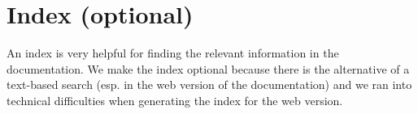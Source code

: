 \section{Index (optional)}
\label{reference_06}

An index is very helpful for finding the relevant information in the documentation. We make the index optional because there is the alternative of a text-based search (esp. in the web version of the documentation) and we ran into technical difficulties when generating the index for the web version.
